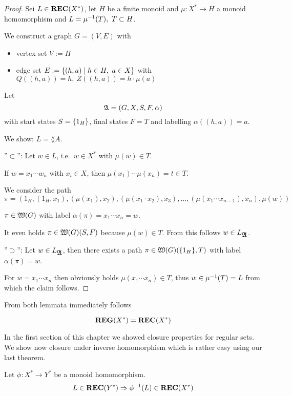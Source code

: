 \begin{proof}
Sei $L \in \mbox{{\bf REC}}(X^*)$, let $H$ be a finite monoid and $\mu : X^* \to
H$ a monoid homomorphism and $L = {{\mu}^{-1}}(T),\ T \subset H$.

We construct a graph $G = (V, E)$ with
\begin{itemize}
  \item vertex set $V := H$
  \item edge set $E := \mbox{$\{(h, a) \mid h \in H,\ a \in X\}$}$ with $Q((h,a)) =
  h,\ Z((h,a)) = h \cdot \mu(a)$
\end{itemize}

Let
\[ \mbox{$\mathfrak{A}$} = (G, X, S, F, \alpha) \]
with start states $S = \mbox{$\{1_H\}$}$, final states $F = T$ and labelling 
$\alpha((h, a)) = a$.

We show: $L = \lang{A}$.

''$\subset$'': Let $w \in L$, i.e.\ $w \in X^*$ with $\mu(w) \in T$.

If $w = x_1 \cdots w_n$ with $x_i \in X$, then $\mu(x_1) \cdots \mu(x_n) = t
\in T$.

We consider the path
\[ \pi = (1_H, (1_H, x_1), (\mu(x_1), x_2), (\mu(x_1 \cdot x_2),
x_3), \ldots, (\mu(x_1 \cdots x_{n-1}), x_n), \mu(w)) \]

$\pi \in \mbox{$\mathfrak{W}({G})$}$ with label $\alpha(\pi) = x_1 \cdots x_n = w$. 

It even holds $\pi \in \mbox{$\mathfrak{W}({G})$}(S, F)$ because $\mu(w) \in T$. From this
follows $w \in L_{\mbox{$\mathfrak{A}$}}$.

''$\supset$'': Let $w \in L_{\mbox{$\mathfrak{A}$}}$, then there exists a path $\pi \in
\mbox{$\mathfrak{W}({G})$}(\mbox{$\{1_H\}$}, T)$ with label $\alpha(\pi) = w$. 

For $w = x_1 \cdots x_n$ then obviously holds $\mu(x_1 \cdots x_n) \in T$, thus
$w \in {{\mu}^{-1}}(T) = L$ from which the claim follows.
\end{proof}

From both lemmata immediately follows

\begin{theorem}
\[ \mbox{{\bf REG}}(X^*) = \mbox{{\bf REC}}(X^*) \]
\end{theorem}

In the first section of this chapter we showed closure properties for regular
sets. We show now closure under inverse homomorphism which is rather easy using
our last theorem.

\begin{theorem}
Let $\phi : X^* \to Y^*$ be a monoid homomorphism.
\[ L \in \mbox{{\bf REC}}(Y^*) \Rightarrow {{\phi}^{-1}}(L) \in \mbox{{\bf REC}}(X^*) \]
\end{theorem}


